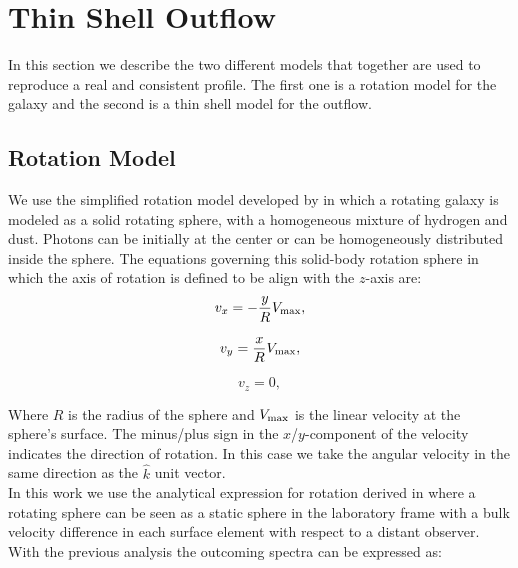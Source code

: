 \documentclass{latex/emulateapj}
\begin{document}



\newpage


\appendix
\section{Thin Shell Outflow}

In this section we describe the two different models that together are used to reproduce a real and consistent \lya profile. The first one is a rotation model for the galaxy and the second is a thin shell model for the outflow. \\ 

\subsection{Rotation Model}

We use the simplified rotation model developed by \citep{Garavito14} in which a rotating galaxy is modeled as a solid rotating sphere, with a homogeneous mixture of hydrogen and dust. Photons can be initially at the center or can be homogeneously distributed inside the sphere. The equations governing this solid-body rotation sphere in
which the axis of rotation is defined to be align with the $z$-axis are: \\

\begin{equation}
v_{x}=-\frac{y}{R}V_{\rm max}, \label{subeq1}
\end{equation}

\begin{equation}
v_{y}=\frac{x}{R}V_{\rm max}, \label{subeq2}
\end{equation}

\begin{equation}
v_{z}=0, \label{subeq3}
\end{equation}

Where $R$ is the radius of the sphere and $V_{\rm max}$ is the linear velocity at the sphere's surface. The minus/plus sign in the $x$/$y$-component of the velocity indicates the direction of rotation. In this case we take the angular velocity in the same direction as the $\hat{k}$ unit vector.\\

In this work we use the analytical expression for rotation derived in \citep{Garavito14} where a rotating sphere can be seen as a static sphere in the laboratory frame with a bulk velocity difference in each surface element with respect to a distant observer. With the previous analysis the outcoming spectra can be expressed as:\\
\end{document}
